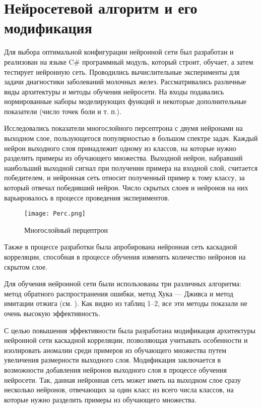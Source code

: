 \section{Нейросетевой алгоритм и его модификация}

Для выбора оптимальной конфигурации нейронной сети был разработан и реализован на языке C\# программный модуль, который строит, обучает, а затем тестирует нейронную сеть. Проводились вычислительные эксперименты для задачи диагностики заболеваний молочных желез. Рассматривались  различные виды архитектуры и методы обучения нейросети. На входы подавались нормированные наборы моделирующих функций и некоторые дополнительные показатели (число точек боли и т. п.).

Исследовались показатели многослойного персептрона с двумя нейронами на выходном слое, пользующегося популярностью в большом спектре задач. Каждый нейрон выходного слоя принадлежит одному из классов, на которые нужно разделить примеры из обучающего множества. Выходной нейрон, набравший наибольший выходной сигнал при получении примера на входной слой, считается победителем, и нейронная сеть относит полученный пример к тому классу, за который отвечал победивший нейрон. Число скрытых слоев и нейронов на них варьировалось в процессе проведения экспериментов.

\begin{figure}[h]
	\centering
	\texttt{[image: Perc.png]}
	\caption{Многослойный перцептрон}
\end{figure}

Также в процессе разработки была апробирована нейронная сеть каскадной корреляции, способная в процессе обучения изменять количество нейронов на скрытом слое.

Для обучения нейронной сети были использованы три различных алгоритма: метод обратного распространения ошибки, метод Хука --- Дживса и метод имитации отжига (см. \cite{Ya1}). Как видно из таблиц 1--2, все эти методы показали не очень высокую эффективность.

С целью повышения эффективности была разработана модификация архитектуры нейронной сети каскадной корреляции, позволяющая учитывать особенности и изолировать аномалии среди примеров из обучающего множества путем увеличения размерности выходного слоя.  Модификация заключается в возможности добавления нейронов выходного слоя в процессе обучения нейросети. Так, данная нейронная сеть может иметь на выходном слое сразу несколько нейронов, отвечающих за один класс из всего числа классов, на которые нужно разделить примеры из обучающего множества.

